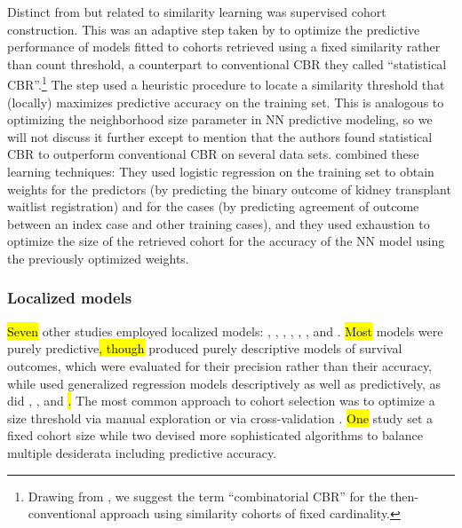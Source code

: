 \documentclass[sn-mathphys,Numbered,pdflatex]{sn-jnl}
\theoremstyle{remark}
\theoremstyle{definition}
\begin{document}
Distinct from but related to similarity learning was supervised cohort
construction. This was an adaptive step taken by \citet{Park2006} to
optimize the predictive performance of models fitted to cohorts
retrieved using a fixed similarity rather than count threshold, a
counterpart to conventional CBR they called ``statistical
CBR''.\footnote{Drawing from \citet{Goyal2008}, we suggest the term
  ``combinatorial CBR'' for the then-conventional approach using
  similarity cohorts of fixed cardinality.} The step used a heuristic
procedure to locate a similarity threshold that (locally) maximizes
predictive accuracy on the training set. This is analogous to optimizing
the neighborhood size parameter in NN predictive modeling, so we will
not discuss it further except to mention that the authors found
statistical CBR to outperform conventional CBR on several data sets.
\citet{CampilloGimenez2013} combined these learning techniques: They
used logistic regression on the training set to obtain weights for the
predictors (by predicting the binary outcome of kidney transplant
waitlist registration) and for the cases (by predicting agreement of
outcome between an index case and other training cases), and they used
exhaustion to optimize the size of the retrieved cohort for the accuracy
of the NN model using the previously optimized weights.

\subsubsection{Localized models}\label{localized-models}

\hl{Seven} other studies employed localized models:
\citet{Mariuzzi1997}, \citet{Lee2015}, \citet{Verma2015},
\citet{Wang2019}, \citet{Ma2020}, \citet{Liu2022}, and
\citet{Doborjeh2022}. \hl{Most} models were purely
predictive\hl{, though} \citet{Mariuzzi1997} produced purely descriptive
models of survival outcomes, which were evaluated for their precision
rather than their accuracy, while \citet{Ng2015} used generalized
regression models descriptively as well as predictively, as did
\citet{Tang2021}, \citet{Ng2021}, and \citet{Liu2022}\hl{.} The most
common approach to cohort selection was to optimize a size threshold via
manual exploration
\citep{Mariuzzi1997, Lee2015, Ng2015, Lee2017, Wang2019, Vilhena2016} or
via cross-validation \citep{Lowsky2013, Verma2015}. \hl{One} study
\citep{Ma2020} set a fixed cohort size while two
\citep{Liang2015, Tang2021, Ng2021} devised more sophisticated
algorithms to balance multiple desiderata including predictive accuracy.
\end{document}
